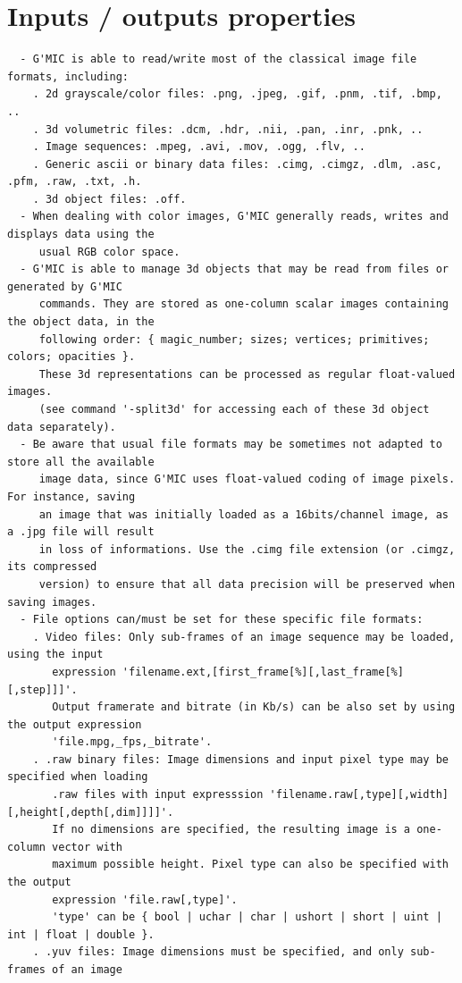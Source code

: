 \documentclass[a4paper,11pt,twoside]{book}
\begin{document}
\section{Inputs / outputs properties}
\small
\begin{lstlisting}
  - G'MIC is able to read/write most of the classical image file formats, including: 
    . 2d grayscale/color files: .png, .jpeg, .gif, .pnm, .tif, .bmp, .. 
    . 3d volumetric files: .dcm, .hdr, .nii, .pan, .inr, .pnk, .. 
    . Image sequences: .mpeg, .avi, .mov, .ogg, .flv, .. 
    . Generic ascii or binary data files: .cimg, .cimgz, .dlm, .asc, .pfm, .raw, .txt, .h. 
    . 3d object files: .off. 
  - When dealing with color images, G'MIC generally reads, writes and displays data using the 
     usual RGB color space. 
  - G'MIC is able to manage 3d objects that may be read from files or generated by G'MIC 
     commands. They are stored as one-column scalar images containing the object data, in the 
     following order: { magic_number; sizes; vertices; primitives; colors; opacities }. 
     These 3d representations can be processed as regular float-valued images. 
     (see command '-split3d' for accessing each of these 3d object data separately). 
  - Be aware that usual file formats may be sometimes not adapted to store all the available 
     image data, since G'MIC uses float-valued coding of image pixels. For instance, saving 
     an image that was initially loaded as a 16bits/channel image, as a .jpg file will result 
     in loss of informations. Use the .cimg file extension (or .cimgz, its compressed 
     version) to ensure that all data precision will be preserved when saving images. 
  - File options can/must be set for these specific file formats: 
    . Video files: Only sub-frames of an image sequence may be loaded, using the input 
       expression 'filename.ext,[first_frame[%][,last_frame[%][,step]]]'. 
       Output framerate and bitrate (in Kb/s) can be also set by using the output expression 
       'file.mpg,_fps,_bitrate'. 
    . .raw binary files: Image dimensions and input pixel type may be specified when loading 
       .raw files with input expresssion 'filename.raw[,type][,width][,height[,depth[,dim]]]]'. 
       If no dimensions are specified, the resulting image is a one-column vector with 
       maximum possible height. Pixel type can also be specified with the output 
       expression 'file.raw[,type]'. 
       'type' can be { bool | uchar | char | ushort | short | uint | int | float | double }. 
    . .yuv files: Image dimensions must be specified, and only sub-frames of an image 

\end{lstlisting}
\end{document}
